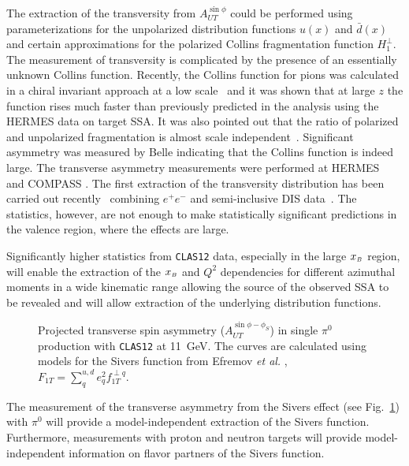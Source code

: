 The extraction of the transversity from $A^{\sin\phi}_{UT}$ could be 
performed using parameterizations for the unpolarized distribution 
functions $u(x)$ and $\bar{d}(x)$ and certain approximations for the 
polarized Collins fragmentation function $H_1^{\perp}$.  The measurement of 
transversity is complicated by the presence of an essentially unknown Collins 
function.  Recently, the Collins function for pions was calculated in a chiral 
invariant approach at a low scale~\cite{Bacchetta:2002tk} and it was shown 
that at large $z$ the function rises much faster than previously predicted 
\cite{Efremov:2002ut,Kotzinian:1999dy} in the analysis using the HERMES data 
on target SSA.  It was also pointed out that the ratio of polarized and 
unpolarized fragmentation is almost scale independent~\cite{Bacchetta:2002tk}.
Significant asymmetry was measured by Belle \cite{Abe:2005zx} indicating that 
the Collins function is indeed large.  The transverse asymmetry measurements 
were performed at HERMES~\cite{Airapetian:2001eg} and COMPASS
\cite{Alexakhin:2005iw}.  The first extraction of the transversity 
distribution has been carried out recently~\cite{Anselmino:2007fs} combining 
$e^+e^-$ and semi-inclusive DIS data~\cite{Airapetian:2004tw}.  The 
statistics, however, are not enough to make statistically significant 
predictions in the valence region, where the effects are large.

Significantly higher statistics from {\tt CLAS12} data, especially in the 
large $x_{\scriptscriptstyle B}$ region, will enable the extraction of the $x_{\scriptscriptstyle B}$ and $Q^2$ 
dependencies for different azimuthal moments in a wide kinematic range 
allowing the source of the observed SSA to be revealed and will allow
extraction of the underlying distribution functions.

\begin{figure}[htbp]
\vspace{7.0cm}
\caption{\small{Projected transverse spin asymmetry ($A_{UT}^{\sin\phi-\phi_S}$)
in single $\pi^0$ production with {\tt CLAS12} at 11~GeV.  The curves are 
calculated using models for the Sivers function from Efremov {\it et al.}
\cite{Efremov:2004tp}, $F_{1T}=\sum_q^{u,d}e_q^2f_{1T}^{\perp q}$.}}
\label{fig:autsiv1}
\end{figure}

The measurement of the transverse asymmetry from the Sivers effect (see 
Fig.~\ref{fig:autsiv1}) with $\pi^0$ will provide a model-independent 
extraction of the Sivers function. Furthermore, measurements with proton and 
neutron targets will provide  model-independent information on flavor
partners of the Sivers function.

